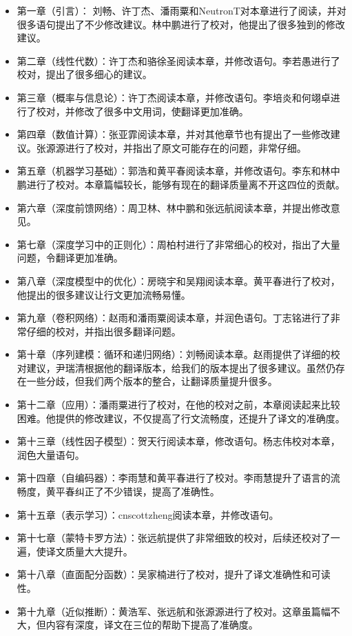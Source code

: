 \begin{itemize}
\item  第一章（引言）： 刘畅、许丁杰、潘雨粟和NeutronT对本章进行了阅读，并对很多语句提出了不少修改建议。林中鹏进行了校对，他提出了很多独到的修改建议。
\item  第二章（线性代数）：许丁杰和骆徐圣阅读本章，并修改语句。李若愚进行了校对，提出了很多细心的建议。
\item  第三章（概率与信息论）：许丁杰阅读本章，并修改语句。李培炎和何翊卓进行了校对，并修改了很多中文用词，使翻译更加准确。
\item  第四章（数值计算）：张亚霏阅读本章，并对其他章节也有提出了一些修改建议。张源源进行了校对，并指出了原文可能存在的问题，非常仔细。
\item  第五章（机器学习基础）：郭浩和黄平春阅读本章，并修改语句。李东和林中鹏进行了校对。本章篇幅较长，能够有现在的翻译质量离不开这四位的贡献。
\item  第六章（深度前馈网络）：周卫林、林中鹏和张远航阅读本章，并提出修改意见。
\item  第七章（深度学习中的正则化）：周柏村进行了非常细心的校对，指出了大量问题，令翻译更加准确。
\item  第八章（深度模型中的优化）：房晓宇和吴翔阅读本章。黄平春进行了校对，他提出的很多建议让行文更加流畅易懂。
\item  第九章（卷积网络）：赵雨和潘雨粟阅读本章，并润色语句。丁志铭进行了非常仔细的校对，并指出很多翻译问题。
\item  第十章（序列建模：循环和递归网络）：刘畅阅读本章。赵雨提供了详细的校对建议，尹瑞清根据他的翻译版本，给我们的版本提出了很多建议。虽然仍存在一些分歧，但我们两个版本的整合，让翻译质量提升很多。
\item  第十二章（应用）：潘雨粟进行了校对，在他的校对之前，本章阅读起来比较困难。他提供的修改建议，不仅提高了行文流畅度，还提升了译文的准确度。
\item  第十三章（线性因子模型）：贺天行阅读本章，修改语句。杨志伟校对本章，润色大量语句。
\item  第十四章（自编码器）：李雨慧和黄平春进行了校对。李雨慧提升了语言的流畅度，黄平春纠正了不少错误，提高了准确性。
\item  第十五章（表示学习）：cnscottzheng阅读本章，并修改语句。
\item  第十七章（蒙特卡罗方法）：张远航提供了非常细致的校对，后续还校对了一遍，使译文质量大大提升。
\item  第十八章（直面配分函数）：吴家楠进行了校对，提升了译文准确性和可读性。
\item  第十九章（近似推断）：黄浩军、张远航和张源源进行了校对。这章虽篇幅不大，但内容有深度，译文在三位的帮助下提高了准确度。
\end{itemize}
 
